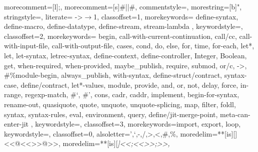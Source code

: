 


 {
  morecomment=[l]{;},         %
  morecomment=[s]{\#|}{|\#},  %
  commentstyle={\color{ForestGreen}\slshape\sffamily},
  morestring=[b]",
  stringstyle=\color{red},
  literate=%
    {->}{{$\rightarrow$}}1,
  classoffset=1,
    morekeywords={
      define-syntax, define-macro, define-datatype, define-stream, stream-lambda
    },
    keywordstyle=\color{blue},
  classoffset=2,
    morekeywords={
      begin, call-with-current-continuation, call/cc, call-with-input-file, call-with-output-file,
      cases, cond, do, else, for, time, for-each,
      let*, let, let-syntax, letrec-syntax,
      define-context, define-controller, Integer, Boolean, get, when-required, when-provided,
      maybe_publish, require, submod, or/c, ->, \#\%module-begin, always_publish, with-syntax, define-struct/contract, syntax-case, define/contract,
      let*-values,
      module, provide,
      and, or, not,
      delay, force, in-range, regexp-match,
      \#`, \#',
      cons, cadr, caddr,
      implement, begin-for-syntax, rename-out,
      quasiquote, quote, unquote, unquote-splicing,
      map, filter, foldl, syntax, syntax-rules, eval, environment, query,
      define/jit-merge-point, meta-can-enter-jit
    },
    keywordstyle=\color{blue},
  classoffset=3,
    morekeywords={import, export, loop},
    keywordstyle=\color{Purple},
  classoffset=0,
  alsoletter={',`,-,/,>,<,\#,\%},
  moredelim=**[is][\color{lightgray}]{<<@<<}{>>@>>},
  moredelim=**[is][\itshape\color{OliveGreen}]{<<;<<}{>>;>>},
}

